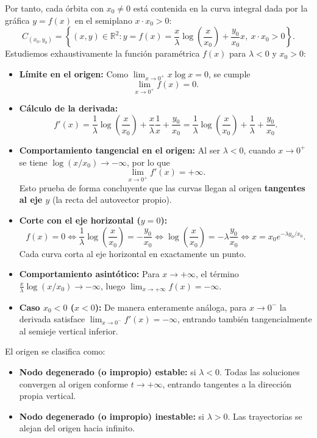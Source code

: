 Por tanto, cada órbita con $x_0 \neq 0$ está contenida en la curva integral dada por la gráfica $y = f(x)$ en el semiplano $x \cdot x_0 > 0$:
\[
    C_{(x_0, y_0)} = \left\{ (x, y) \in \mathbb{R}^2 : y = f(x) = \frac{x}{\lambda} \log \left( \frac{x}{x_0} \right) + \frac{y_0}{x_0} x, \ x \cdot x_0 > 0 \right\}.
\]
Estudiemos exhaustivamente la función paramétrica $f(x)$ para $\lambda < 0$ y $x_0 > 0$:
\begin{itemize}
    \item \textbf{Límite en el origen:} Como $\lim_{x \to 0^+} x \log x = 0$, se cumple
    \[
        \lim_{x \to 0^+} f(x) = 0.
    \]
    \item \textbf{Cálculo de la derivada:}
    \[
        f'(x) = \frac{1}{\lambda} \log \left( \frac{x}{x_0} \right) + \frac{x}{\lambda} \frac{1}{x} + \frac{y_0}{x_0}
        = \frac{1}{\lambda} \log \left( \frac{x}{x_0} \right) + \frac{1}{\lambda} + \frac{y_0}{x_0}.
    \]
    \item \textbf{Comportamiento tangencial en el origen:} Al ser $\lambda < 0$, cuando $x \to 0^+$ se tiene $\log(x/x_0) \to -\infty$, por lo que
    \[
        \lim_{x \to 0^+} f'(x) = +\infty.
    \]
    Esto prueba de forma concluyente que las curvas llegan al origen \textbf{tangentes al eje $y$} (la recta del autovector propio).
    \item \textbf{Corte con el eje horizontal ($y = 0$):}
    \[
        f(x) = 0 \iff \frac{1}{\lambda} \log \left( \frac{x}{x_0} \right) = -\frac{y_0}{x_0} \iff \log \left( \frac{x}{x_0} \right) = -\lambda \frac{y_0}{x_0} \iff x = x_0 e^{-\lambda y_0 / x_0}.
    \]
    Cada curva corta al eje horizontal en exactamente un punto.
    \item \textbf{Comportamiento asintótico:} Para $x \to +\infty$, el término $\frac{x}{\lambda} \log(x/x_0) \to -\infty$, luego $\lim_{x \to +\infty} f(x) = -\infty$.
    \item \textbf{Caso $x_0 < 0$ ($x < 0$):} De manera enteramente análoga, para $x \to 0^-$ la derivada satisface $\lim_{x \to 0^-} f'(x) = -\infty$, entrando también tangencialmente al semieje vertical inferior.
\end{itemize}
El origen se clasifica como:
\begin{itemize}
    \item \textbf{Nodo degenerado (o impropio) estable:} si $\lambda < 0$. Todas las soluciones convergen al origen conforme $t \to +\infty$, entrando tangentes a la dirección propia vertical.
    \item \textbf{Nodo degenerado (o impropio) inestable:} si $\lambda > 0$. Las trayectorias se alejan del origen hacia infinito.
\end{itemize}

